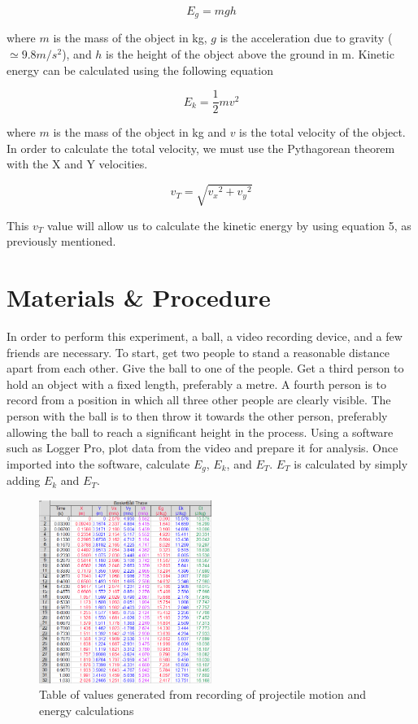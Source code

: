 \documentclass[10pt,twocolumn,letterpaper]{article}
\begin{document}
\begin{equation}
    E_{g}=mgh
\end{equation}

where \(m\) is the mass of the object in kg, \(g\) is the acceleration due to gravity (\(\simeq 9.8m/s^2\)), and \(h\) is the height of the object above the ground in m. Kinetic energy can be calculated using the following equation

\begin{equation}
    E_{k}=\frac{1}{2}mv^2
\end{equation}

where \(m\) is the mass of the object in kg and \(v\) is the total velocity of the object. In order to calculate the total velocity, we must use the Pythagorean theorem with the X and Y velocities. 

\begin{equation}
    v_{T}=\sqrt{{v_{x}}^2 + {v_{y}}^2}
\end{equation}

This \(v_{T}\) value will allow us to calculate the kinetic energy by using equation 5, as previously mentioned. 

\section{Materials \& Procedure}

In order to perform this experiment, a ball, a video recording device, and a few friends are necessary. To start, get two people to stand a reasonable distance apart from each other. Give the ball to one of the people. Get a third person to hold an object with a fixed length, preferably a metre. A fourth person is to record from a position in which all three other people are clearly visible. The person with the ball is to then throw it towards the other person, preferably allowing the ball to reach a significant height in the process. Using a software such as Logger Pro, plot data from the video and prepare it for analysis. Once imported into the software, calculate \(E_{g}\), \(E_{k}\), and \(E_{T}\). \(E_{T}\) is calculated by simply adding \(E_{k}\) and \(E_{T}\).

\begin{figure}
  \centering
  \includegraphics[width=0.5\textwidth]{figures/LoggerPro_voixZIMd34.png}
  \caption{Table of values generated from recording of projectile motion and energy calculations}
\end{figure}
\end{document}
